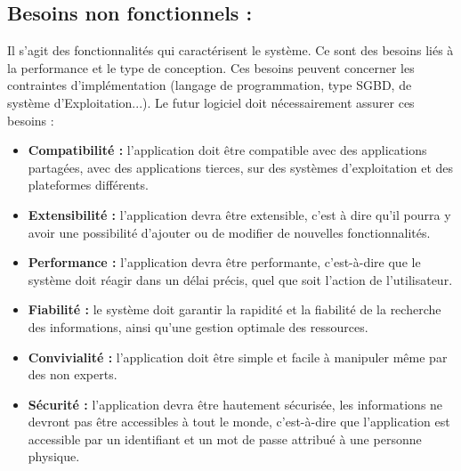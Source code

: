 \documentclass[12pt,a4paper,twoside]{report}
\begin{document}
{			\subsection{Besoins non fonctionnels :}{
				Il s’agit des fonctionnalités qui caractérisent le système. Ce sont des besoins liés à la performance et le type de conception. Ces besoins peuvent concerner les contraintes d’implémentation (langage de programmation, type SGBD, de système d'Exploitation...). Le futur logiciel doit nécessairement assurer ces besoins :
				\begin{itemize}[label=$\Diamond$]
						\item \textbf{Compatibilité :} l'application doit être compatible avec des applications partagées, avec des applications tierces, sur des systèmes d’exploitation et des plateformes différents.
						\item \textbf{Extensibilité :} l'application devra être extensible, c'est à dire qu'il pourra y avoir une possibilité d'ajouter ou de modifier de nouvelles fonctionnalités.
						\item \textbf{Performance :} l’application devra être performante, c'est-à-dire que le système doit réagir dans un délai précis, quel que soit l’action de l’utilisateur.
						\item \textbf{Fiabilité :} le système doit garantir la rapidité et la fiabilité de la recherche des informations, ainsi qu'une gestion optimale des ressources.
						\item \textbf{Convivialité :} l’application doit être simple et facile à manipuler même par des non experts.
						\item \textbf{Sécurité :} l’application devra être hautement sécurisée, les informations ne devront pas être accessibles à tout le monde, c'est-à-dire que l'application est accessible par un identifiant et un mot de passe attribué à une personne physique.
				\end{itemize}
			}
	}
\end{document}
